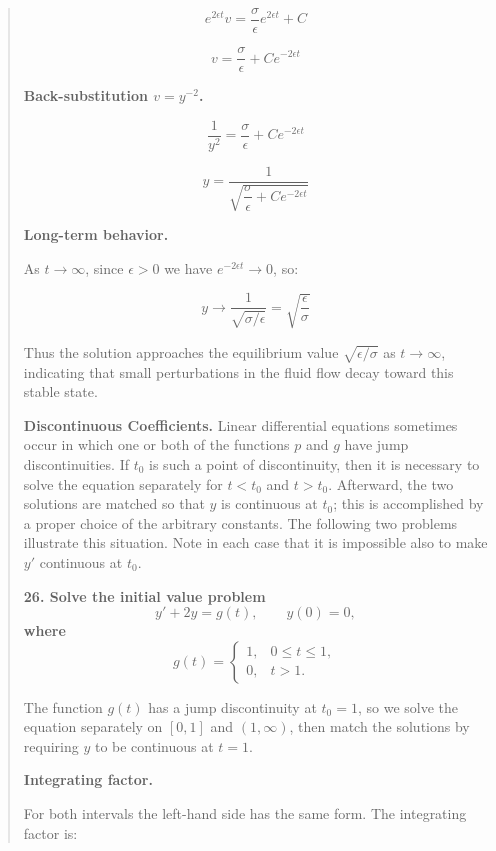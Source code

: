 \begin{quote}
\begin{respuesta}
\[
e^{2\epsilon t}v = \frac{\sigma}{\epsilon}e^{2\epsilon t} + C
\]

\[
v = \frac{\sigma}{\epsilon} + Ce^{-2\epsilon t}
\]

\textbf{Back-substitution $v = y^{-2}$.}

\[
\frac{1}{y^2} = \frac{\sigma}{\epsilon} + Ce^{-2\epsilon t}
\]

\[
\boxed{y = \frac{1}{\sqrt{\dfrac{\sigma}{\epsilon} + Ce^{-2\epsilon t}}}}
\]

\textbf{Long-term behavior.}

As $t \to \infty$, since $\epsilon > 0$ we have $e^{-2\epsilon t} \to 0$, so:

\[
y \to \frac{1}{\sqrt{\sigma/\epsilon}} = \sqrt{\frac{\epsilon}{\sigma}}
\]

Thus the solution approaches the equilibrium value $\sqrt{\epsilon/\sigma}$ as $t \to \infty$,
indicating that small perturbations in the fluid flow decay toward this stable state.

\end{respuesta}

\noindent\textbf{Discontinuous Coefficients.} Linear differential equations sometimes occur in which one or both of the functions $p$ and $g$ have jump discontinuities. If $t_0$ is such a point of discontinuity, then it is necessary to solve the equation separately for $t < t_0$ and $t > t_0$. Afterward, the two solutions are matched so that $y$ is continuous at $t_0$; this is accomplished by a proper choice of the arbitrary constants. The following two problems illustrate this situation. Note in each case that it is impossible also to make $y'$ continuous at $t_0$.



\textbf{26. Solve the initial value problem
    \[ y' + 2y = g(t), \qquad y(0) = 0, \]
    where
    \[ g(t) = \begin{cases} 1, & 0 \le t \le 1, \\ 0, & t > 1. \end{cases} \]}
\begin{respuesta}

The function $g(t)$ has a jump discontinuity at $t_0 = 1$, so we solve the equation
separately on $[0,1]$ and $(1, \infty)$, then match the solutions by requiring $y$ to be
continuous at $t = 1$.

\textbf{Integrating factor.}

For both intervals the left-hand side has the same form. The integrating factor is:


\end{respuesta}
\end{quote}
